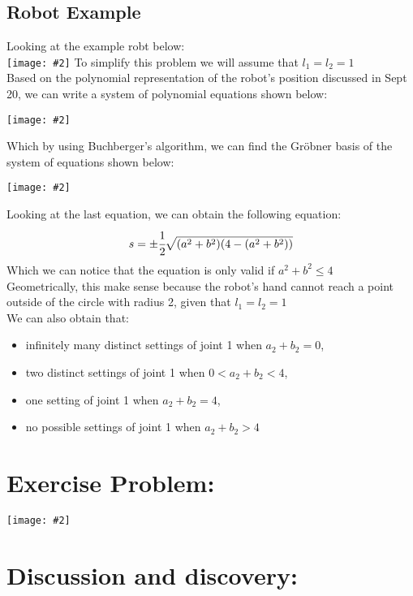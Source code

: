\documentclass[11pt]{article}
\newcommand{\image}[2]{\texttt{[image: \#2]}}
\newcommand{\myalign}[1]{\begin{align*}#1\end{align*}}
\begin{document}
\subsection{Robot Example}
Looking at the example robt below: \\
\image{0.5}{img3}
To simplify this problem we will assume that $l_1 = l_2 = 1$ \\
Based on the polynomial representation of the robot's position discussed in Sept 20, we can write a system of polynomial equations shown below: \\
\begin{center}
    \image{0.5}{img4}
\end{center}
Which by using Buchberger's algorithm, we can find the Gröbner basis of the system of equations shown below: \\
\begin{center}
    \image{0.5}{img5}
\end{center}
Looking at the last equation, we can obtain the following equation: \\
\myalign{
    s = \pm \cfrac{1}{2}\sqrt{(a^2+b^2)(4-(a^2+b^2))}
}
Which we can notice that the equation is only valid if $a^2+b^2 \leq 4$ \\
Geometrically, this make sense because the robot's hand cannot reach a point outside of the circle with radius 2, given that $l_1 = l_2 = 1$ \\
We can also obtain that:
\begin{itemize}
    \item infinitely many distinct settings of joint 1 when $a_2 + b_2 = 0$,
    \item two distinct settings of joint 1 when $0<a_2 +b_2 <4$,
    \item one setting of joint 1 when $a_2 +b_2 =4$,
    \item no possible settings of joint 1 when $a_2 + b_2 > 4$
\end{itemize}

\section{Exercise Problem:}
\image{0.44}{img6}

\section{Discussion and discovery:}
\end{document}
